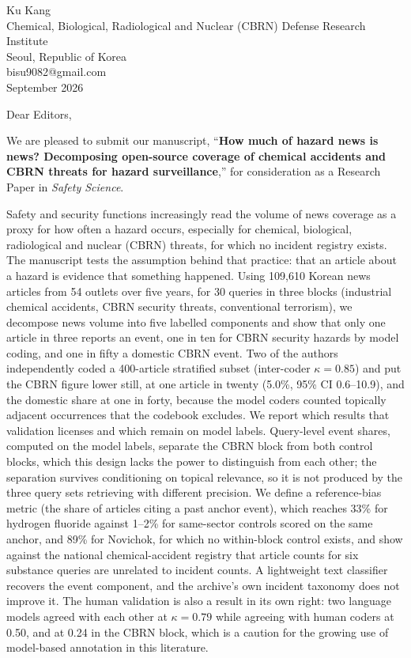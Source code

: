 \documentclass[11pt]{article}
\begin{document}
\thispagestyle{empty}

\noindent Ku Kang\\
Chemical, Biological, Radiological and Nuclear (CBRN) Defense Research Institute\\
Seoul, Republic of Korea\\
bisu9082@gmail.com\\

\vspace{0.5em}
 September 2026

\vspace{1em}
\noindent Dear Editors,

We are pleased to submit our manuscript, ``\textbf{How much of hazard news is news? Decomposing open-source coverage of chemical accidents and CBRN threats for hazard surveillance},'' for consideration as a Research Paper in \emph{Safety Science}.

Safety and security functions increasingly read the volume of news coverage as a proxy for how often a hazard occurs, especially for chemical, biological, radiological and nuclear (CBRN) threats, for which no incident registry exists. The manuscript tests the assumption behind that practice: that an article about a hazard is evidence that something happened. Using 109,610 Korean news articles from 54 outlets over five years, for 30 queries in three blocks (industrial chemical accidents, CBRN security threats, conventional terrorism), we decompose news volume into five labelled components and show that only one article in three reports an event, one in ten for CBRN security hazards by model coding, and one in fifty a domestic CBRN event. Two of the authors independently coded a 400-article stratified subset (inter-coder $\kappa = 0.85$) and put the CBRN figure lower still, at one article in twenty (5.0\%, 95\% CI 0.6--10.9), and the domestic share at one in forty, because the model coders counted topically adjacent occurrences that the codebook excludes. We report which results that validation licenses and which remain on model labels. Query-level event shares, computed on the model labels, separate the CBRN block from both control blocks, which this design lacks the power to distinguish from each other; the separation survives conditioning on topical relevance, so it is not produced by the three query sets retrieving with different precision. We define a reference-bias metric (the share of articles citing a past anchor event), which reaches 33\% for hydrogen fluoride against 1--2\% for same-sector controls scored on the same anchor, and 89\% for Novichok, for which no within-block control exists, and show against the national chemical-accident registry that article counts for six substance queries are unrelated to incident counts. A lightweight text classifier recovers the event component, and the archive's own incident taxonomy does not improve it. The human validation is also a result in its own right: two language models agreed with each other at $\kappa = 0.79$ while agreeing with human coders at 0.50, and at 0.24 in the CBRN block, which is a caution for the growing use of model-based annotation in this literature.
\end{document}
